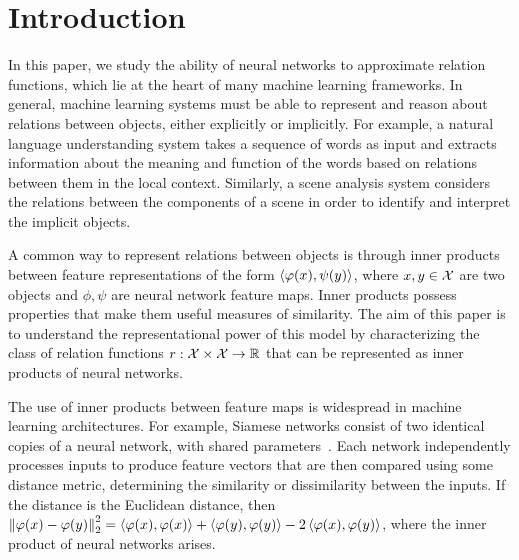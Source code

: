 \section{Introduction}\label{sec:intro}


In this paper, we study the ability of neural networks to approximate relation functions, which lie at the heart of many machine learning frameworks. In general, machine learning systems must be able to represent and reason about relations between objects, either explicitly or implicitly. For example, a natural language understanding system takes a sequence of words as input and extracts information about the meaning and function of the words based on relations between them in the local context. Similarly, a scene analysis system considers the relations between the components of a scene in order to identify and interpret the implicit objects.

A common way to represent relations between objects is through inner products between feature representations of the form $\left \langle \varphi(x), \psi(y) \right\rangle$, where $x, y \in {\mathcal{X}}$ are two objects and $\phi, \psi$ are neural network feature maps. Inner products possess properties that make them useful measures of similarity. The aim of this paper is to understand the representational power of this model by characterizing the class of relation functions $r: {\mathcal{X}} \times {\mathcal{X}} \to \mathbb{R}$ that can be represented as inner products of neural networks.

The use of inner products between feature maps is widespread in machine learning architectures. 
For example, Siamese networks consist of two identical copies of a neural network, with shared parameters~\parencite{rumelhartLearningRepresentationsBackpropagating1986,langTimedelayNeuralNetwork1988,bromleySignatureVerificationUsing1993,baldiNeuralNetworksFingerprint1993,chopraLearningSimilarityMetric2005,kochSiameseNeuralNetworks2015}. Each network independently processes inputs to produce feature vectors that are then compared using some distance metric, determining the similarity or dissimilarity between the inputs. If the distance is the Euclidean distance, then $\left\lVert\varphi(x) - \varphi(y)\right\rVert_{2}^2 = \left \langle \varphi(x), \varphi(x) \right\rangle + \left \langle \varphi(y), \varphi(y) \right\rangle - 2 \left \langle \varphi(x), \varphi(y) \right\rangle$, where the inner product of neural networks arises.

